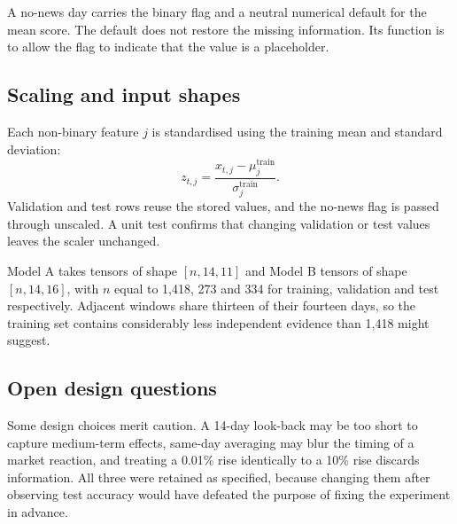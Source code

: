 A no-news day carries the binary flag and a neutral numerical default for the mean score. The default does not restore the missing information. Its function is to allow the flag to indicate that the value is a placeholder.

\subsection{Scaling and input shapes}
Each non-binary feature $j$ is standardised using the training mean and standard deviation:
\begin{equation}
z_{t,j}=\frac{x_{t,j}-\mu^{\mathrm{train}}_j}{\sigma^{\mathrm{train}}_j}.
\end{equation}
Validation and test rows reuse the stored values, and the no-news flag is passed through unscaled. A unit test confirms that changing validation or test values leaves the scaler unchanged.

Model A takes tensors of shape $[n,14,11]$ and Model B tensors of shape $[n,14,16]$, with $n$ equal to 1,418, 273 and 334 for training, validation and test respectively. Adjacent windows share thirteen of their fourteen days, so the training set contains considerably less independent evidence than 1,418 might suggest.

\subsection{Open design questions}
Some design choices merit caution. A 14-day look-back may be too short to capture medium-term effects, same-day averaging may blur the timing of a market reaction, and treating a 0.01\% rise identically to a 10\% rise discards information. All three were retained as specified, because changing them after observing test accuracy would have defeated the purpose of fixing the experiment in advance.
